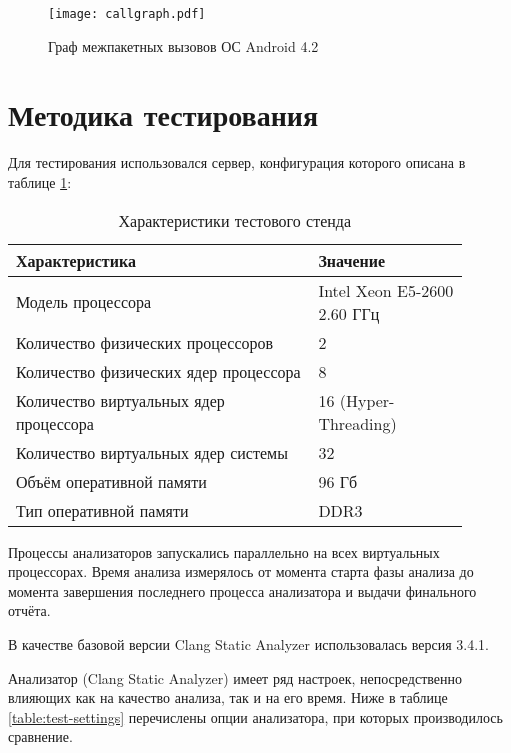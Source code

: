 
\begin{figure}
   \centering
   \texttt{[image: callgraph.pdf]}
   \caption{Граф межпакетных вызовов ОС Android 4.2}\label{pic:callgraph}
\end{figure}


\section{Методика тестирования}

Для тестирования использовался сервер, конфигурация которого описана в таблице \ref{table:test-server}:

\begin{table} [htbp]
  \centering
  \parbox{15cm}{\caption{Характеристики тестового стенда}\label{table:test-server}}
  \begin{tabular}{| p{0.6\linewidth} || p{0.3\linewidth} |}
  \hline
  \hline
  Характеристика   & Значение \\
  \hline
  \hline
  Модель процессора   & Intel Xeon E5-2600 2.60 ГГц \\
  \hline
  Количество физических процессоров & 2   \\
  \hline
  Количество физических ядер процессора      & 8    \\
  \hline
  Количество виртуальных ядер процессора  & 16 (Hyper-Threading)   \\
  \hline
  Количество виртуальных ядер системы & 32   \\
  \hline
  Объём оперативной памяти & 96 Гб \\
  \hline
  Тип оперативной памяти & DDR3 \\
  \hline
  \hline
  \end{tabular}
\end{table}

Процессы анализаторов запускались параллельно на всех виртуальных процессорах. Время анализа измерялось от момента старта фазы анализа до момента завершения последнего процесса анализатора и выдачи финального отчёта.

В качестве базовой версии Clang Static Analyzer использовалась версия 3.4.1.

Анализатор (Clang Static Analyzer) имеет ряд настроек, непосредственно влияющих как на качество анализа, так и на его время. Ниже в таблице \ref{table:test-settings} перечислены опции анализатора, при которых производилось сравнение.

